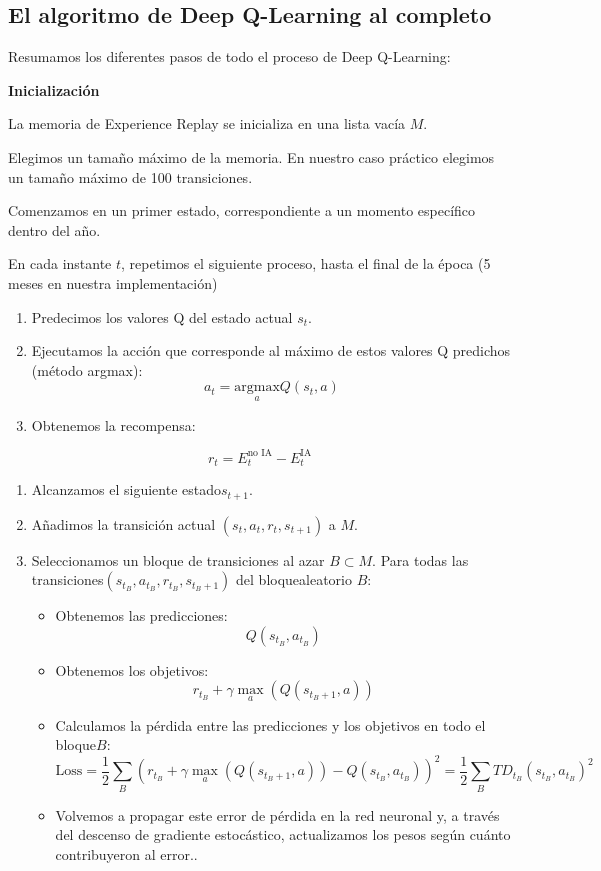 \documentclass[]{book}
\providecommand{\tightlist}{%
  \setlength{\itemsep}{0pt}\setlength{\parskip}{0pt}}
\begin{document}
\hypertarget{el-algoritmo-de-deep-q-learning-al-completo}{%
\subsection{El algoritmo de Deep Q-Learning al completo}\label{el-algoritmo-de-deep-q-learning-al-completo}}

Resumamos los diferentes pasos de todo el proceso de Deep Q-Learning:

\textbf{Inicialización}

La memoria de Experience Replay se inicializa en una lista vacía \(M\).

Elegimos un tamaño máximo de la memoria. En nuestro caso práctico elegimos un tamaño máximo de 100 transiciones.

Comenzamos en un primer estado, correspondiente a un momento específico dentro del año.

En cada instante \(t\), repetimos el siguiente proceso, hasta el final de la época (5 meses en nuestra implementación)

\begin{enumerate}
\def\labelenumi{\arabic{enumi}.}
\tightlist
\item
  Predecimos los valores Q del estado actual \(s_t\).
\item
  Ejecutamos la acción que corresponde al máximo de estos valores Q predichos (método argmax):
  \[a_t = \underset{a}{\textrm{argmax}} Q(s_t, a)\]
\item
  Obtenemos la recompensa:
\end{enumerate}

\[r_t = E_t^{\textrm{no IA}} - E_t^{\textrm{IA}}\]

\begin{enumerate}
\def\labelenumi{\arabic{enumi}.}
\setcounter{enumi}{3}
\item
  Alcanzamos el siguiente estado\(s_{t+1}\).
\item
  Añadimos la transición actual \((s_t, a_t, r_t, s_{t+1})\) a \(M\).
\item
  Seleccionamos un bloque de transiciones al azar \(B \subset M\). Para todas las transiciones\((s_{t_B}, a_{t_B}, r_{t_B}, s_{t_B+1})\) del bloquealeatorio \(B\):

  \begin{itemize}
  \tightlist
  \item
    Obtenemos las predicciones: \[Q(s_{t_B}, a_{t_B})\]
  \item
    Obtenemos los objetivos: \[r_{t_B} + \gamma \underset{a}{\max}(Q(s_{t_B+1}, a))\]
  \item
    Calculamos la pérdida entre las predicciones y los objetivos en todo el bloque\(B\): \[\textrm{Loss} = \frac{1}{2} \sum_B \left( r_{t_B} + \gamma \underset{a}{\max}(Q(s_{t_B+1}, a)) - Q(s_{t_B}, a_{t_B}) \right)^2 = \frac{1}{2} \sum_B TD_{t_B}(s_{t_B}, a_{t_B})^2\]
  \item
    Volvemos a propagar este error de pérdida en la red neuronal y, a través del descenso de gradiente estocástico, actualizamos los pesos según cuánto contribuyeron al error..
  \end{itemize}
\end{enumerate}
\end{document}
